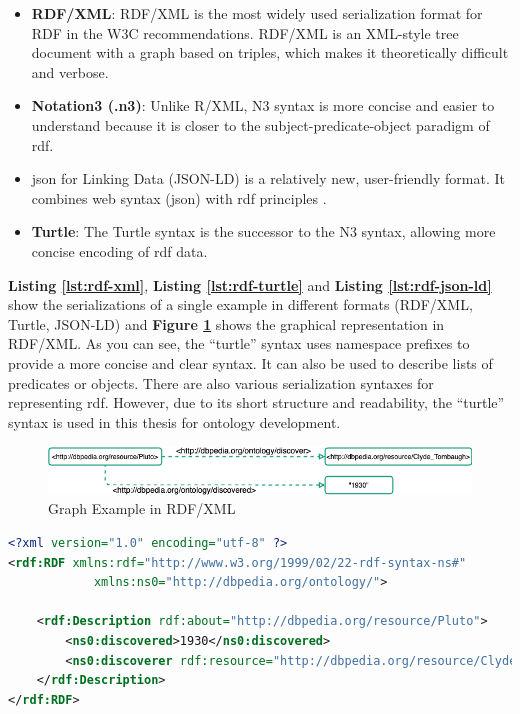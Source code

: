                 \begin{itemize}
                    \item \textbf{RDF/XML}: RDF/XML is the most widely used serialization format for RDF in the W3C recommendations. RDF/XML is an XML-style tree document with a graph based on triples, which makes it theoretically difficult and verbose. 
                    \item \textbf{Notation3 (.n3)}: Unlike R/XML, N3 syntax is more concise and easier to understand because it is closer to the subject-predicate-object paradigm of \acrshort{rdf}. 
                    \item \acrfull{json} for Linking Data (JSON-LD) is a relatively new, user-friendly format. It combines web syntax (\acrshort{json}) with \acrshort{rdf} principles \cite{grlicky2005overview}. 
                    \item \textbf{Turtle}: The Turtle syntax is the successor to the N3 syntax, allowing more concise encoding of \acrshort{rdf} data.
                \end{itemize}

                \textbf{Listing \ref{lst:rdf-xml}}, \textbf{Listing \ref{lst:rdf-turtle}} and \textbf{Listing \ref{lst:rdf-json-ld}} show the serializations of a single example in different formats (RDF/XML, Turtle, JSON-LD) and \textbf{Figure \ref{fig:rdf-xml-example}} shows the graphical representation in RDF/XML. As you can see, the “turtle” syntax uses namespace prefixes to provide a more concise and clear syntax. It can also be used to describe lists of predicates or objects. There are also various serialization syntaxes for representing \acrshort{rdf}. However, due to its short structure and readability, the “turtle” syntax is used in this thesis for ontology development.\\
            
                \begin{figure}[H]
                    \centering
                    \includegraphics[scale=0.6]{images/Foundation-RDF XML.drawio.png}
                    \caption{\label{fig:rdf-xml-example}  Graph Example in RDF/XML}
                \end{figure}

                \begin{lstlisting}[language=XML, caption=Example of RDF Serialization in RDF/XML, label={lst:rdf-xml}]
<?xml version="1.0" encoding="utf-8" ?>
<rdf:RDF xmlns:rdf="http://www.w3.org/1999/02/22-rdf-syntax-ns#"
            xmlns:ns0="http://dbpedia.org/ontology/">

    <rdf:Description rdf:about="http://dbpedia.org/resource/Pluto">
        <ns0:discovered>1930</ns0:discovered>
        <ns0:discoverer rdf:resource="http://dbpedia.org/resource/Clyde_Tombaugh"/>
    </rdf:Description>
</rdf:RDF>
                \end{lstlisting}

